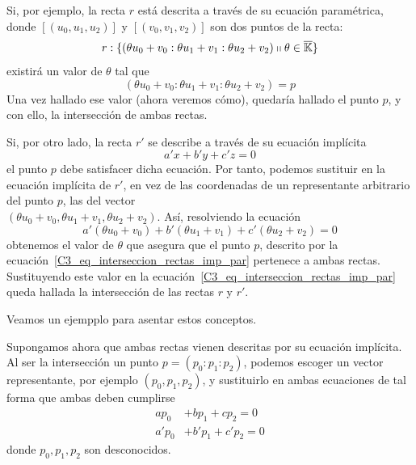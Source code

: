 Si, por ejemplo, la recta $r$ está descrita a través de su ecuación paramétrica, donde $[(u_0,u_1,u_2)]$ y $[(v_0,v_1,v_2)]$ son dos puntos de la recta:
\begin{equation*}
	r:\{(\theta u_0+v_0:\theta u_1+v_1:\theta u_2+v_2)\shortparallel \theta\in\overline{\mathbb{K}}\}
\end{equation*}
existirá un valor de $\theta$ tal que 
\begin{equation}
\label{C3_eq_interseccion_rectas_imp_par}
	(\theta u_0+v_0:\theta u_1+v_1:\theta u_2+v_2)=p
\end{equation}
Una vez hallado ese valor (ahora veremos cómo), quedaría hallado el punto $p$, y con ello, la intersección de ambas rectas.

Si, por otro lado, la recta $r'$ se describe a través de su ecuación implícita
\begin{equation*}
	a'x+b'y+c'z=0
\end{equation*}
el punto $p$ debe satisfacer dicha ecuación. Por tanto, podemos sustituir en la ecuación implícita de $r'$, en vez de las coordenadas de un representante arbitrario del punto $p$, las del vector\\
$(\theta u_0+v_0,\theta u_1+v_1,\theta u_2+v_2)$. Así, resolviendo la ecuación
\begin{equation*}
 	a'(\theta u_0+v_0)+b'(\theta u_1+v_1)+c'(\theta u_2+v_2)=0
\end{equation*}
obtenemos el valor de $\theta$ que asegura que el punto $p$, descrito por la ecuación~\eqref{C3_eq_interseccion_rectas_imp_par} pertenece a ambas rectas. Sustituyendo este valor en la ecuación~\eqref{C3_eq_interseccion_rectas_imp_par} queda hallada la intersección de las rectas $r$ y $r'$.

Veamos un ejempplo para asentar estos conceptos.
\begin{exa}
	
\end{exa}

Supongamos ahora que ambas rectas vienen descritas por su ecuación implícita. Al ser la intersección un punto $p=(p_0:p_1:p_2)$, podemos escoger un vector representante, por ejemplo $(p_0,p_1,p_2)$, y sustituirlo en ambas ecuaciones de tal forma que ambas deben cumplirse
\begin{equation*}
	\begin{split}
		ap_0&+bp_1+cp_2=0\\
		a'p_0&+b'p_1+c'p_2=0
	\end{split}
\end{equation*}
donde $p_0,p_1,p_2$ son desconocidos.

